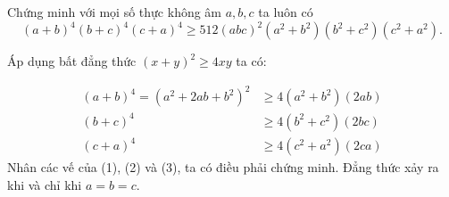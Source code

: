 \begin{problem}
	Chứng minh với mọi số thực không âm $a, b, c$ ta luôn có
	$$
		(a + b)^4(b + c)^4(c + a)^4 \ge 512(abc)^2(a^2 + b^2)(b^2 + c^2)(c^2 + a^2).
	$$
	\solution

	Áp dụng bất đẳng thức $(x + y)^2 \ge 4xy$ ta có:

	\begin{align}
		(a + b)^4 = (a^2 + 2ab + b^2)^2 &\ge 4(a^2 + b^2)(2ab) \\
		(b + c)^4 &\ge 4(b^2 + c^2)(2bc) \\
		(c + a)^4 &\ge 4(c^2 + a^2)(2ca)
	\end{align}
	Nhân các vế của (1), (2) và (3), ta có điều phải chứng minh.
	Đẳng thức xảy ra khi và chỉ khi $a = b = c$.
\end{problem}

